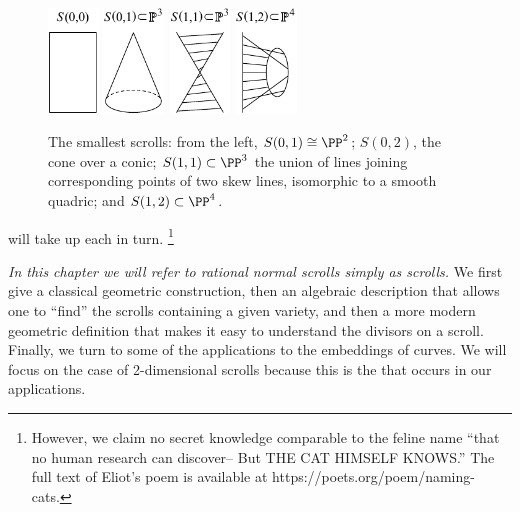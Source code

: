 \begin{figure}[h]
\includegraphics[height=1.1in]{"main/Fig16-1A"}\qquad
\includegraphics[height=1.1in]{"main/Fig16-1B"}\qquad
\includegraphics[height=1.1in]{"main/Fig16-1C"}\qquad
\includegraphics[height=1.1in]{"main/Fig16-1D"}%
\caption{The smallest scrolls: from the left, $S(0,1) \cong \PP^{2}$;
$S(0,2)$, the cone over a conic; $S(1,1)\subset \PP^{3}$ the union of
lines joining corresponding points of two skew lines, isomorphic to a
smooth quadric; and $S(1,2)\subset \PP^{4}$.
\vspace*{-10pt}
}
\label{Fig16.1}
\end{figure}
%
will take up each in turn.%
\footnote{However, we claim no secret knowledge comparable to the
feline name ``that no human research can discover-- But THE CAT
HIMSELF KNOWS.'' The full text of Eliot's poem is available at
https://poets.org/\allowbreak poem/naming-cats.%
}%

{\it In this chapter 
we will refer to rational normal scrolls simply as scrolls.}
We first give
a classical geometric construction, then an algebraic description that
allows one to ``find'' the scrolls containing a given variety, and
then a more modern geometric definition that makes it easy to
understand the divisors on a scroll. Finally, we turn to some of the
applications to the embeddings of curves. We will focus on the case of
2-dimensional scrolls because this is the 
that occurs in our applications.

